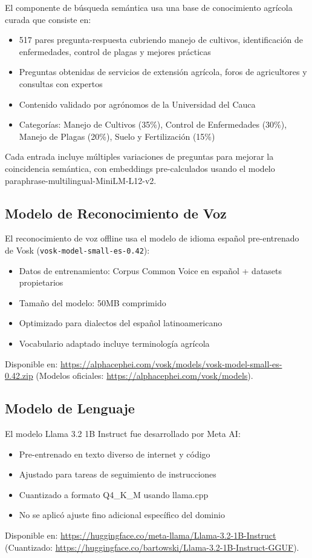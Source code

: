 \documentclass[11pt,a4paper]{article}
\begin{document}
El componente de búsqueda semántica usa una base de conocimiento agrícola curada que consiste en:
\begin{itemize}
    \item 517 pares pregunta-respuesta cubriendo manejo de cultivos, identificación de enfermedades, control de plagas y mejores prácticas
    \item Preguntas obtenidas de servicios de extensión agrícola, foros de agricultores y consultas con expertos
    \item Contenido validado por agrónomos de la Universidad del Cauca
    \item Categorías: Manejo de Cultivos (35\%), Control de Enfermedades (30\%), Manejo de Plagas (20\%), Suelo y Fertilización (15\%)
\end{itemize}

Cada entrada incluye múltiples variaciones de preguntas para mejorar la coincidencia semántica, con embeddings pre-calculados usando el modelo paraphrase-multilingual-MiniLM-L12-v2.

\subsection{Modelo de Reconocimiento de Voz}

El reconocimiento de voz offline usa el modelo de idioma español pre-entrenado de Vosk (\texttt{vosk-model-small-es-0.42}):
\begin{itemize}
    \item Datos de entrenamiento: Corpus Common Voice en español + datasets propietarios
    \item Tamaño del modelo: 50MB comprimido
    \item Optimizado para dialectos del español latinoamericano
    \item Vocabulario adaptado incluye terminología agrícola
\end{itemize}
Disponible en: \url{https://alphacephei.com/vosk/models/vosk-model-small-es-0.42.zip} (Modelos oficiales: \url{https://alphacephei.com/vosk/models}).

\subsection{Modelo de Lenguaje}

El modelo Llama 3.2 1B Instruct fue desarrollado por Meta AI:
\begin{itemize}
    \item Pre-entrenado en texto diverso de internet y código
    \item Ajustado para tareas de seguimiento de instrucciones
    \item Cuantizado a formato Q4\_K\_M usando llama.cpp
    \item No se aplicó ajuste fino adicional específico del dominio
\end{itemize}
Disponible en: \url{https://huggingface.co/meta-llama/Llama-3.2-1B-Instruct} (Cuantizado: \url{https://huggingface.co/bartowski/Llama-3.2-1B-Instruct-GGUF}).
\end{document}
